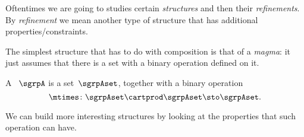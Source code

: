

\label{ch:monoids}

Oftentimes we are going to studies certain \emph{structures} and then their \emph{refinements}.
By \emph{refinement} we mean another type of structure that has additional properties/constraints.

The simplest structure that has to do with composition is that of a \emph{magma}: it just assumes that there is a set with a binary operation defined on it.

\begin{definition}[Magma]
  \label{def:magma}
  A \emph{}~$\sgrpA$ is a set~$\sgrpAset$, together with a binary operation
  \begin{equation}
    \mtimes  \colon \sgrpAset \cartprod \sgrpAset \sto \sgrpAset.
  \end{equation}
\end{definition}

We can build more interesting structures by looking at the properties that such operation can have.



\devel{}

\devel{}
\devel{
}

\devel{}

\devel{}


